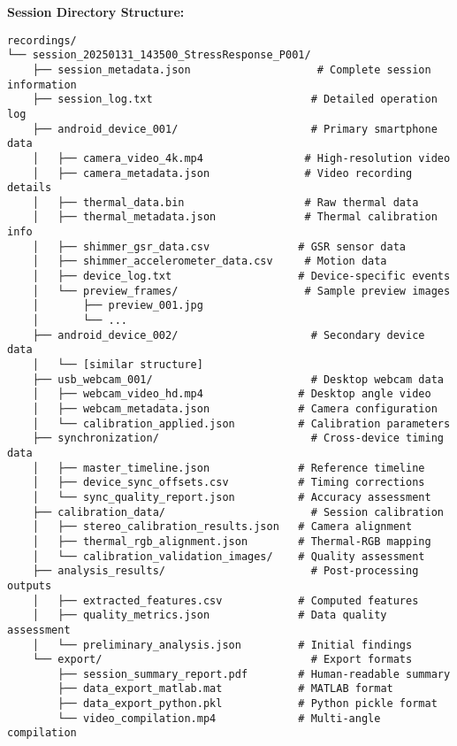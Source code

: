\documentclass[11pt,a4paper]{article}
\begin{document}
\textbf{Session Directory Structure:}

\begin{verbatim}
recordings/
└── session_20250131_143500_StressResponse_P001/
    ├── session_metadata.json                    # Complete session information
    ├── session_log.txt                         # Detailed operation log
    ├── android_device_001/                     # Primary smartphone data
    │   ├── camera_video_4k.mp4                # High-resolution video
    │   ├── camera_metadata.json               # Video recording details
    │   ├── thermal_data.bin                   # Raw thermal data
    │   ├── thermal_metadata.json              # Thermal calibration info
    │   ├── shimmer_gsr_data.csv              # GSR sensor data
    │   ├── shimmer_accelerometer_data.csv     # Motion data
    │   ├── device_log.txt                    # Device-specific events
    │   └── preview_frames/                    # Sample preview images
    │       ├── preview_001.jpg
    │       └── ...
    ├── android_device_002/                     # Secondary device data
    │   └── [similar structure]
    ├── usb_webcam_001/                         # Desktop webcam data
    │   ├── webcam_video_hd.mp4               # Desktop angle video
    │   ├── webcam_metadata.json              # Camera configuration
    │   └── calibration_applied.json          # Calibration parameters
    ├── synchronization/                        # Cross-device timing data
    │   ├── master_timeline.json              # Reference timeline
    │   ├── device_sync_offsets.csv           # Timing corrections
    │   └── sync_quality_report.json          # Accuracy assessment
    ├── calibration_data/                       # Session calibration
    │   ├── stereo_calibration_results.json   # Camera alignment
    │   ├── thermal_rgb_alignment.json        # Thermal-RGB mapping
    │   └── calibration_validation_images/    # Quality assessment
    ├── analysis_results/                       # Post-processing outputs
    │   ├── extracted_features.csv            # Computed features
    │   ├── quality_metrics.json              # Data quality assessment
    │   └── preliminary_analysis.json         # Initial findings
    └── export/                                 # Export formats
        ├── session_summary_report.pdf        # Human-readable summary
        ├── data_export_matlab.mat            # MATLAB format
        ├── data_export_python.pkl            # Python pickle format
        └── video_compilation.mp4             # Multi-angle compilation
\end{verbatim}
\end{document}
